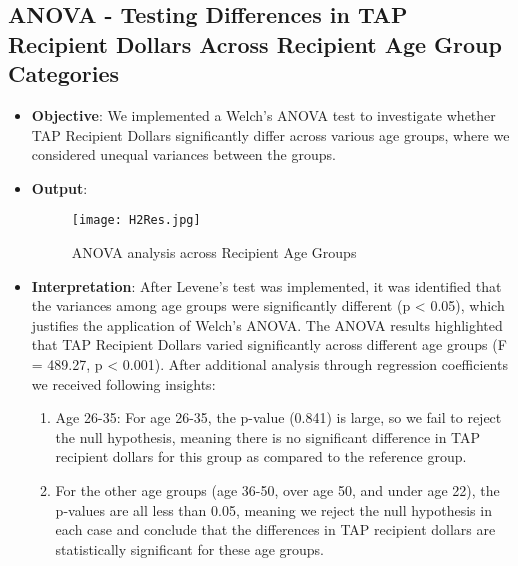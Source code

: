 \documentclass[sigconf]{acmart}
\begin{document}
\subsection{ANOVA - Testing Differences in TAP Recipient Dollars Across Recipient Age Group Categories}
\begin{itemize}
    \item \textbf{Objective}: We implemented a Welch's ANOVA test to investigate whether TAP Recipient Dollars significantly differ across various age groups, where we considered unequal variances between the groups.
    \item \textbf{Output}:
    \begin{figure}[h] 
    \centering
    \texttt{[image: H2Res.jpg]} 
    \caption{ANOVA analysis across Recipient Age Groups} 
    \label{fig:data_testing} 
    \end{figure}
    \item \textbf{Interpretation}:
    After Levene's test was implemented, it was identified that the variances among age groups were significantly different (p < 0.05), which justifies the application of Welch's ANOVA. The ANOVA results highlighted that TAP Recipient Dollars varied significantly across different age groups (F = 489.27, p < 0.001). After additional analysis through regression coefficients we received following insights:  
    \begin{enumerate}
        \item Age 26-35: For age 26-35, the p-value (0.841) is large, so we fail to reject the null hypothesis, meaning there is no significant difference in TAP recipient dollars for this group as compared to the reference group.
        \item For the other age groups (age 36-50, over age 50, and under age 22), the p-values are all less than 0.05, meaning we reject the null hypothesis in each case and conclude that the differences in TAP recipient dollars are statistically significant for these age groups.
    \end{enumerate}
    
\end{itemize}
\end{document}

